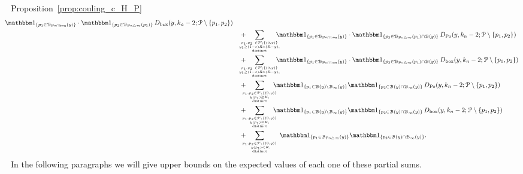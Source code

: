 \begin{proofof}{Proposition~\ref{prop:couling_c_H_P}}
\begin{align}
		\hspace{-10pt} \ind{p_1 \in \BallInter{y}} \cdot \ind{p_2 \in \BallSym{p_1}} 
		\, D_{\text{box}} (y,k_n-2;\Pcal \setminus \{ p_1,p_2\}) \label{eq:sum_2}\\
	&\hspace{10pt}+  \hspace{-15pt} \sum_{{p_1,p_2 \ \in \Pcal \setminus \{(0,y) \} 
		\atop y_1 \geq (1-\eps) R \wedge (R-y),} \atop \text{distinct}} \hspace{-10pt}
		\ind{p_1 \in \BallInter{y}} \cdot \ind{p_2 \in \BallSym{p_1}\cap \BallHyp{y}} 
		\, D_{\Po} (y,k_n-2;\Pcal \setminus \{ p_1,p_2\}) \label{eq:sum_3} \\
	&\hspace{10pt}+ \hspace{-15pt} \sum_{{p_1,p_2 \ \in \Pcal \setminus \{(0,y) \} 
		\atop y_1 \geq (1-\eps) R \wedge (R-y),} \atop \text{distinct}} \hspace{-10pt}
		\ind{p_1 \in \BallInter{y}} \cdot \ind{p_2 \in \BallSym{p_1}\cap \BallHyp{y}} 
		\, D_{\text{box}} (y,k_n-2;\Pcal \setminus \{ p_1,p_2\}) \label{eq:sum_4} \\
	&\hspace{10pt}+ \hspace{-10pt} \sum_{{p_1,p_2 \in\Pcal \setminus \{(0,y)\} 
		\atop y(p_1) \geq K,} \atop \text{distinct}} \hspace{-10pt} \ind{p_1\in \BallHyp{y}\setminus \BallPo{y}} \ind{p_2\in \BallHyp{y}\cap \BallPo{y}} 
		\, D_{\Po} (y,k_n-2;\Pcal \setminus \{ p_1,p_2\}) \label{eq:sum_5}\\
	&\hspace{10pt}+ \hspace{-10pt} \sum_{{p_1,p_2 \in\Pcal \setminus \{(0,y)\} 
			\atop y(p_1) \geq K,} \atop \text{distinct}} \hspace{-10pt} \ind{p_1\in \BallHyp{y}\setminus \BallPo{y}} \ind{p_2\in \BallHyp{y}\cap \BallPo{y}} 
			\, D_{\text{box}} (y,k_n-2;\Pcal \setminus \{ p_1,p_2\}) \label{eq:sum_5b}\\
	&\hspace{10pt}+ \hspace{-10pt} \sum_{{p_1,p_2 \in\Pcal \setminus \{(0,y)\} \atop \ y(p_1) < K,} \atop \text{distinct}}
		\ind{p_1\in \BallSym{y}} \ind{p_2\in \BallHyp{y}\cap \BallPo{y}}. \label{eq:sum_6}
\end{align}
In the following paragraphs we will give upper bounds on the expected values of each one of these partial sums. 


\end{proofof}
